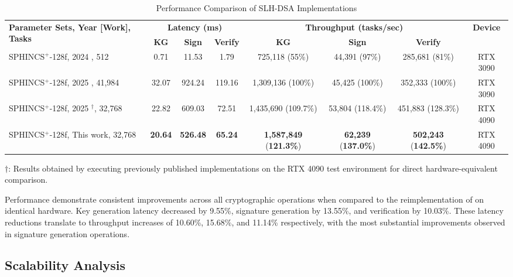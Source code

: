 \documentclass[journal]{IEEEtran}
\begin{document}
\begin{table}[t]
  \centering
  \caption{Performance Comparison of SLH-DSA Implementations}
  \label{tab:comparative_perf}
  \begin{tabular}{@{}lccccccc@{}}
    \toprule
    \multirow{2}{*}{\textbf{Parameter Sets, Year [Work], Tasks}} & \multicolumn{3}{c}{\textbf{Latency (ms)}} & \multicolumn{3}{c}{\textbf{Throughput (tasks/sec)}} & \multirow{2}{*}{\textbf{Device}} \\
    \cmidrule(lr){2-4} \cmidrule(lr){5-7}
    & \textbf{KG} & \textbf{Sign} & \textbf{Verify} & \textbf{KG} & \textbf{Sign} & \textbf{Verify} & \\
    \midrule
    SPHINCS$^+$-128f, 2024 \cite{Kim2024}, 512  & 0.71 & 11.53 & 1.79 & 725,118 (55\%) & 44,391 (97\%) & 285,681 (81\%) & RTX 3090 \\
    SPHINCS$^+$-128f, 2025 \cite{Wang2025}, 41,984 & 32.07 & 924.24 & 119.16 & 1,309,136 (100\%) & 45,425 (100\%) & 352,333 (100\%) & RTX 3090 \\
    SPHINCS$^+$-128f, 2025 \cite{Wang2025}$^\dagger$, 32,768 & 22.82 & 609.03 & 72.51 & 1,435,690 (109.7\%) & 53,804 (118.4\%) & 451,883 (128.3\%) & RTX 4090 \\
    SPHINCS$^+$-128f, This work, 32,768 & \textbf{20.64} & \textbf{526.48} & \textbf{65.24} & \textbf{1,587,849} (\textbf{121.3\%}) & \textbf{62,239} (\textbf{137.0\%}) & \textbf{502,243} (\textbf{142.5\%}) & RTX 4090 \\
    \bottomrule
  \end{tabular}
  \begin{tablenotes}
  \item[] $\dagger$: Results obtained by executing previously published implementations on the RTX 4090 test environment for direct hardware-equivalent comparison.
  \end{tablenotes}
\end{table}

Performance demonstrate consistent improvements across all cryptographic operations when compared to the reimplementation of \cite{Wang2025} on identical hardware.
Key generation latency decreased by 9.55\%, signature generation by 13.55\%, and verification by 10.03\%. These latency reductions translate to throughput increases of 10.60\%, 15.68\%, and 11.14\% respectively, with the most substantial improvements observed in signature generation operations.

\subsection{Scalability Analysis}
\end{document}
